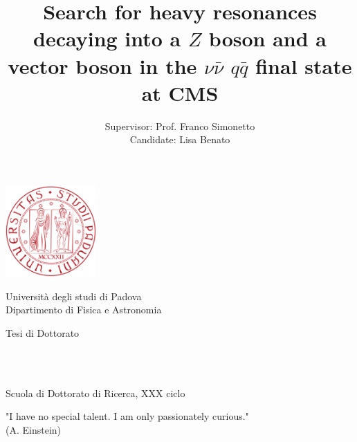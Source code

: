 \documentclass[11pt, a4paper]{book}
\title{Search for heavy resonances decaying into a $Z$ boson and a vector boson in the $\nu \bar{\nu}$ $q\bar{q}$ final state at CMS}
\date{}
\author{Supervisor: Prof. Franco Simonetto \\ Candidate: Lisa Benato} %
\affil{Universit\`a degli studi di Padova}
\begin{document}
\begin{titlingpage} %
\begin{center}
\includegraphics[height=3.5cm]{logo}\\ %
\begin{large}
Universit\`a degli studi di Padova \\ %
Dipartimento di Fisica e Astronomia\\
\end{large}
\vspace{1.5cm} %
\begin{large}
Tesi di Dottorato \\
\end{large}
\vspace{1.5cm}
\begin{tcolorbox}[breakable,colback=black!5!white,colframe=red!80!black,width=\textwidth]
\begin{center}
\begin{Huge} 
{\color{red!80!black}\textbf{\thetitle}} \\
\end{Huge}
\end{center}
\end{tcolorbox}
\vspace{3.5cm}
\theauthor\\
\vspace{5cm} %
Scuola di Dottorato di Ricerca, XXX ciclo
\end{center}
\end{titlingpage}

\newpage\null\thispagestyle{empty}\newpage
\thispagestyle{empty}
\begin{flushright}
\null{}
"I have no special talent. I am only passionately curious."\\
(A. Einstein)
\null
\end{flushright}
\end{document}
